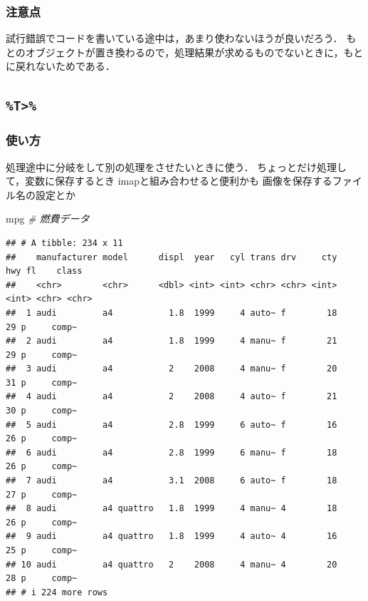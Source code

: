 \documentclass[
]{article}
\newenvironment{Shaded}{\begin{snugshade}}{\end{snugshade}}
\newcommand{\CommentTok}[1]{\textcolor[rgb]{0.56,0.35,0.01}{\textit{#1}}}
\newcommand{\NormalTok}[1]{#1}
\begin{document}
\hypertarget{ux6ce8ux610fux70b9}{%
\subsubsection{注意点}\label{ux6ce8ux610fux70b9}}

試行錯誤でコードを書いている途中は，あまり使わないほうが良いだろう．
もとのオブジェクトが置き換わるので，処理結果が求めるものでないときに，もとに戻れないためである．

\hypertarget{t}{%
\subsection{\texorpdfstring{\texttt{\%T\textgreater{}\%}}{\%T\textgreater\%}}\label{t}}

\hypertarget{ux4f7fux3044ux65b9-1}{%
\subsubsection{使い方}\label{ux4f7fux3044ux65b9-1}}

処理途中に分岐をして別の処理をさせたいときに使う．
ちょっとだけ処理して，変数に保存するとき
imapと組み合わせると便利かも
画像を保存するファイル名の設定とか

\begin{Shaded}
\begin{Highlighting}[]
\NormalTok{mpg }\CommentTok{\# 燃費データ}
\end{Highlighting}
\end{Shaded}

\begin{verbatim}
## # A tibble: 234 x 11
##    manufacturer model      displ  year   cyl trans drv     cty   hwy fl    class
##    <chr>        <chr>      <dbl> <int> <int> <chr> <chr> <int> <int> <chr> <chr>
##  1 audi         a4           1.8  1999     4 auto~ f        18    29 p     comp~
##  2 audi         a4           1.8  1999     4 manu~ f        21    29 p     comp~
##  3 audi         a4           2    2008     4 manu~ f        20    31 p     comp~
##  4 audi         a4           2    2008     4 auto~ f        21    30 p     comp~
##  5 audi         a4           2.8  1999     6 auto~ f        16    26 p     comp~
##  6 audi         a4           2.8  1999     6 manu~ f        18    26 p     comp~
##  7 audi         a4           3.1  2008     6 auto~ f        18    27 p     comp~
##  8 audi         a4 quattro   1.8  1999     4 manu~ 4        18    26 p     comp~
##  9 audi         a4 quattro   1.8  1999     4 auto~ 4        16    25 p     comp~
## 10 audi         a4 quattro   2    2008     4 manu~ 4        20    28 p     comp~
## # i 224 more rows
\end{verbatim}
\end{document}
